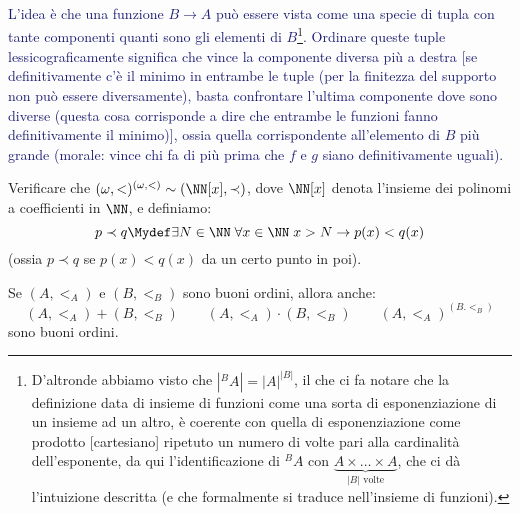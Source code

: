 \documentclass[11pt]{scrartcl}
\begin{document}
\textcolor{MidnightBlue}{L'idea è che una funzione $B \rightarrow A$ può essere vista come una specie di tupla con tante componenti quanti sono gli elementi di $B$\footnote{D'altronde abbiamo visto che $|{}^{B}A| = |A|^{|B|}$, il che ci fa notare che la definizione data di insieme di funzioni come una sorta di esponenziazione di un
insieme ad un altro, è coerente con quella di esponenziazione come prodotto [cartesiano] ripetuto un numero di volte pari alla cardinalità dell'esponente, da qui l'identificazione di ${}^{B}A$ con $\underbrace{A \times \ldots \times A}_{\text{$|B|$ volte}}$, che ci dà l'intuizione descritta (e che formalmente si traduce nell'insieme di funzioni).}.
Ordinare queste tuple lessicograficamente significa che vince la componente diversa più a destra [se definitivamente c'è il minimo in entrambe le tuple (per la finitezza del supporto non può essere diversamente), basta confrontare l'ultima componente dove sono diverse (questa cosa corrisponde a dire che entrambe le funzioni fanno definitivamente il
minimo)], ossia quella corrispondente all'elemento di $B$ più grande (morale: vince chi fa di più prima che $f$ e $g$ siano definitivamente uguali).}

\begin{exercise}
	Verificare che $(\omega,<)^{(\omega,<)} \sim (\NN[x],\prec)$, dove $\NN[x]$ denota l'insieme dei polinomi a coefficienti in $\NN$, e definiamo:
	\[ p \prec q \Mydef \exists N \in \NN \; \forall x \in \NN \; x > N \rightarrow p(x) < q(x)
		\]
	(ossia $p \prec q$ se $p(x)<q(x)$ da un certo punto in poi).
\end{exercise}

\begin{soln}
	
\end{soln}

\begin{proposition}
	Se $(A,<_A)$ e $(B,<_B)$ sono buoni ordini, allora anche:
	\[ (A,<_A) + (B,<_B) \qquad (A,<_A) \cdot (B,<_B) \qquad (A,<_A)^{(B.<_B)}
		\]
	sono buoni ordini.
\end{proposition}
\end{document}
